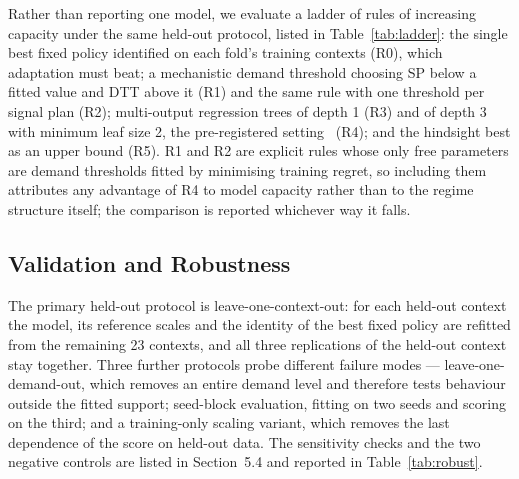 Rather than reporting one model, we evaluate a ladder of rules of increasing capacity
under the same held-out protocol, listed in Table~\ref{tab:ladder}: the single best fixed
policy identified on each fold's training contexts (R0), which adaptation must beat; a
mechanistic demand threshold choosing SP below a fitted value and DTT above it (R1) and
the same rule with one threshold per signal plan (R2); multi-output regression trees of
depth 1 (R3) and of depth 3 with minimum leaf size 2, the pre-registered
setting~\cite{breiman2017cart} (R4); and the hindsight best as an upper bound (R5). R1 and
R2 are explicit rules whose only free parameters are demand thresholds fitted by
minimising training regret, so including them attributes any advantage of R4 to model
capacity rather than to the regime structure itself; the comparison is reported whichever
way it falls.

\subsection{Validation and Robustness}
\label{sec:validation}

The primary held-out protocol is leave-one-context-out: for each held-out context the
model, its reference scales and the identity of the best fixed policy are refitted from
the remaining 23 contexts, and all three replications of the held-out context stay
together. Three further protocols probe different failure modes --- leave-one-demand-out,
which removes an entire demand level and therefore tests behaviour outside the fitted
support; seed-block evaluation, fitting on two seeds and scoring on the third; and a
training-only scaling variant, which removes the last dependence of the score on held-out
data. The sensitivity checks and the two negative controls are listed in Section~5.4 and
reported in Table~\ref{tab:robust}.
